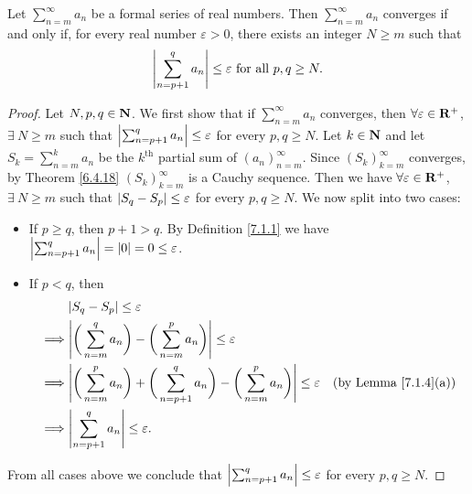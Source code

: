 \setcounter{theorem}{4}
\begin{proposition}\label{7.2.5}
    Let \(\sum_{n = m}^\infty a_n\) be a formal series of real numbers.
    Then \(\sum_{n = m}^\infty a_n\) converges if and only if, for every real number \(\varepsilon > 0\), there exists an integer \(N \geq m\) such that
    \[
        \left\lvert\sum_{n = p + 1}^q a_n\right\rvert \leq \varepsilon \text{ for all } p, q \geq N.
    \]
\end{proposition}

\begin{proof}
    Let \(N, p, q \in \mathbf{N}\).
    We first show that if \(\sum_{n = m}^\infty a_n\) converges, then \(\forall \varepsilon \in \mathbf{R}^+\), \(\exists\ N \geq m\) such that \(\left\lvert\sum_{n = p + 1}^q a_n\right\rvert \leq \varepsilon\) for every \(p, q \geq N\).
    Let \(k \in \mathbf{N}\) and let \(S_k = \sum_{n = m}^k a_n\) be the \(k^{\text{th}}\) partial sum of \((a_n)_{n = m}^\infty\).
    Since \((S_k)_{k = m}^\infty\) converges, by Theorem \ref{6.4.18} \((S_k)_{k = m}^\infty\) is a Cauchy sequence.
    Then we have \(\forall \varepsilon \in \mathbf{R}^+\), \(\exists\ N \geq m\) such that \(\left\lvert S_q - S_p\right\rvert \leq \varepsilon\) for every \(p, q \geq N\).
    We now split into two cases:
    \begin{itemize}
        \item If \(p \geq q\), then \(p + 1 > q\).
              By Definition \ref{7.1.1} we have \(\left\lvert\sum_{n = p + 1}^q a_n\right\rvert = \left\lvert0\right\rvert = 0 \leq \varepsilon\).
        \item If \(p < q\), then
              \begin{align*}
                           & \abs{S_q - S_p} \leq \varepsilon                                                                                                                               \\
                  \implies & \abs{\bigg(\sum_{n = m}^q a_n\bigg) - \bigg(\sum_{n = m}^p a_n\bigg)} \leq \varepsilon                                                                         \\
                  \implies & \abs{\bigg(\sum_{n = m}^p a_n\bigg) + \bigg(\sum_{n = p + 1}^q a_n\bigg) - \bigg(\sum_{n = m}^p a_n\bigg)} \leq \varepsilon & \text{(by Lemma \ref{7.1.4}(a))} \\
                  \implies & \abs{\sum_{n = p + 1}^q a_n} \leq \varepsilon.
              \end{align*}
    \end{itemize}
    From all cases above we conclude that \(\left\lvert\sum_{n = p + 1}^q a_n\right\rvert \leq \varepsilon\) for every \(p, q \geq N\).


\end{proof}
